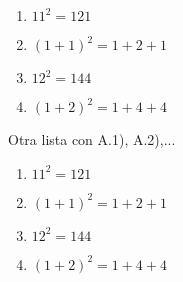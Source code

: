 \documentclass{article}
\begin{document}
	

\begin{enumerate}[(a.)]
	\item $11^2=121$
	\item $(1+1)^2=1+2+1$
	\item $12^2=144$
	\item $(1+2)^2=1+4+4$
\end{enumerate}
Otra lista con A.1), A.2),...\\
\begin{enumerate}[font=\sffamily\bfseries,
	label=A.\arabic*)]
	\item $11^2=121$
	\item $(1+1)^2=1+2+1$
	\item $12^2=144$
	\item $(1+2)^2=1+4+4$
\end{enumerate}




	
	
\end{document}
